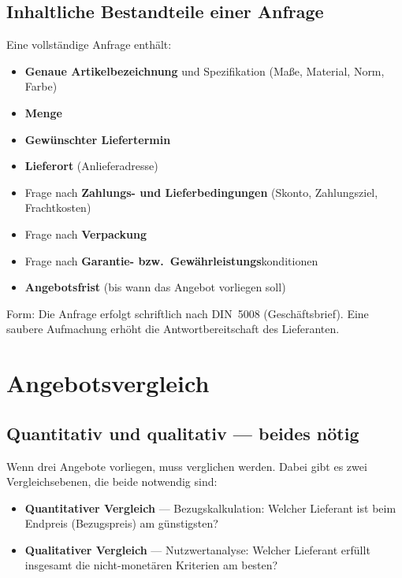 \documentclass[11pt, a4paper]{article}
\begin{document}
\subsection{Inhaltliche Bestandteile einer Anfrage}

Eine vollständige Anfrage enthält:

\begin{itemize}[itemsep=0pt]
  \item \textbf{Genaue Artikelbezeichnung} und Spezifikation (Maße, Material, Norm, Farbe)
  \item \textbf{Menge}
  \item \textbf{Gewünschter Liefertermin}
  \item \textbf{Lieferort} (Anlieferadresse)
  \item Frage nach \textbf{Zahlungs- und Lieferbedingungen} (Skonto, Zahlungsziel, Frachtkosten)
  \item Frage nach \textbf{Verpackung}
  \item Frage nach \textbf{Garantie- bzw.\ Gewährleistungs}­konditionen
  \item \textbf{Angebotsfrist} (bis wann das Angebot vorliegen soll)
\end{itemize}

Form: Die Anfrage erfolgt schriftlich nach DIN~5008 (Geschäfts\-brief). Eine saubere
Aufmachung erhöht die Antwort­bereitschaft des Lieferanten.

\section{Angebotsvergleich}

\subsection{Quantitativ und qualitativ --- beides nötig}

Wenn drei Angebote vorliegen, muss verglichen werden. Dabei gibt es zwei
Vergleichs­ebenen, die beide notwendig sind:

\begin{itemize}[itemsep=0pt]
  \item \textbf{Quantitativer Vergleich} --- Bezugskalkulation: Welcher Lieferant ist beim Endpreis (Bezugspreis) am günstigsten?
  \item \textbf{Qualitativer Vergleich} --- Nutzwertanalyse: Welcher Lieferant erfüllt insgesamt die nicht-monetären Kriterien am besten?
\end{itemize}
\end{document}
